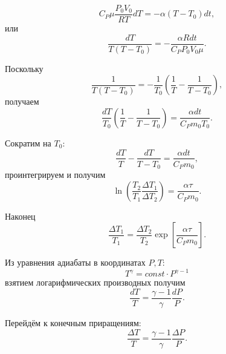\documentclass[12pt]{article}
\begin{document}
	\begin{equation}
	\label{eq:heat_balance2}
	C_P \mu \frac{P_0 V_0}{RT} dT = - \alpha \left( T-T_0 \right) dt,
	\end{equation}
	или
	\begin{equation}
	\label{eq:heat_balance_diff_eq_base}
	\frac{dT}{T \left( T-T_0 \right)} = -\frac{\alpha R dt}{C_P P_0 V_0 \mu}.
	\end{equation}
	
	Поскольку
	\begin{equation}
	\label{eq:temp_other_form}
	\frac{1}{T \left( T-T_0 \right)} = - \frac{1}{T_0} \left( \frac{1}{T} - \frac{1}{T-T_0} \right),
	\end{equation}
	получаем
	\begin{equation}
	\label{eq:heat_balance_diff_eq2}
	\frac{dT}{T_0} \left( \frac{1}{T} - \frac{1}{T-T_0} \right) = \frac{\alpha dt}{C_P m_0 T_0}.
	\end{equation}
	
	Сократим на $T_0$:
	\begin{equation}
	\label{eq:heat_balance_diff_eq_final}
	\frac{dT}{T} - \frac{dT}{T-T_0} = \frac{\alpha dt}{C_P m_0},
	\end{equation}
	проинтегрируем и получим
	\begin{equation}
	\label{eq:heat_balance_eq_integr}
	\ln \left( \frac{T_2}{T_1} \frac{\Delta T_1}{\Delta T_2} \right) = \frac{\alpha \tau}{C_P m_0}.
	\end{equation}
	
	Наконец
	\begin{equation}
	\label{eq:heat_balance_eq_final}
	\frac{\Delta T_1}{T_1} = \frac{\Delta T_2}{T_2} \exp \left[ \frac{\alpha \tau}{C_P m_0} \right].
	\end{equation}
	
	Из уравнения адиабаты в координатах $P, T$:
	\begin{equation}
	\label{eq:adiabate_pt}
	T^\gamma = const \cdot P^{\gamma -1}
	\end{equation}
	взятием логарифмических производных получим
	\begin{equation}
	\label{eq:adiabate_pt_diff}
	\frac{dT}{T}=\frac{\gamma-1}{\gamma} \frac{dP}{P}.
	\end{equation}
	
	Перейдём к конечным приращениям:
	\begin{equation}
	\label{eq:adiabate_pt_end}
	\frac{\Delta T}{T}=\frac{\gamma-1}{\gamma} \frac{\Delta P}{P}.
	\end{equation}
	
\end{document}
